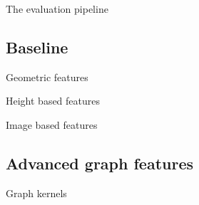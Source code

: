 \documentclass[12pt]{beamer}
\begin{document}
        \begin{frame}{The evaluation pipeline}
            \begin{figure}[H]
                
            \end{figure}
        \end{frame}

        \subsection{Baseline}
            \begin{frame}{Geometric features}
                \centering
                
            \end{frame}

            \begin{frame}{Height based features}
                \centering
                
            \end{frame}

            \begin{frame}{Image based features}
                \centering
                
            \end{frame}

        \subsection{Advanced graph features}
            \begin{frame}{Graph kernels}
                \centering
                
            \end{frame}
\end{document}
